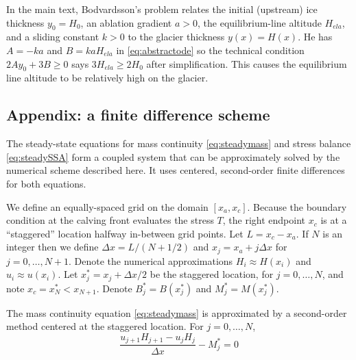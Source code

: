 \documentclass[twocolumn,letterpaper]{igs}
\begin{document}
In the main text, Bodvardsson's problem relates the initial (upstream) ice thickness $y_0=H_0$, an ablation gradient $a>0$, the equilibrium-line altitude $H_{ela}$, and a sliding constant $k>0$ to the glacier thickness $y(x) = H(x)$.  He has $A=-ka$ and $B=k a H_{ela}$ in \eqref{eq:abstractode} so the technical condition $2A y_0 + 3 B \ge 0$ says $3 H_{ela} \ge 2 H_0$ after simplification.  This causes the equilibrium line altitude to be relatively high on the glacier.


\subsection{Appendix: a finite difference scheme}  The steady-state equations for mass continuity \eqref{eq:steadymass} and stress balance \eqref{eq:steadySSA} form a coupled system that can be approximately solved by the numerical scheme described here.  It uses centered, second-order finite differences for both equations.

We define an equally-spaced grid on the domain $[x_a,x_c]$.  Because the boundary condition at the calving front evaluates the stress $T$, the right endpoint $x_c$ is at a ``staggered'' location halfway in-between grid points.  Let $L=x_c-x_a$.  If $N$ is an integer then we define $\Delta x = L / (N+1/2)$ and $x_j = x_a + j\Delta x$ for $j=0,\dots,N+1$.  Denote the numerical approximations $H_i\approx H(x_i)$ and $u_i \approx u(x_i)$.  Let $x_j^* = x_j + \Delta x/2$ be the staggered location, for $j=0,\dots,N$, and note $x_c = x_N^* < x_{N+1}$.  Denote $B_j^*=B(x_j^*)$ and $M_j^*=M(x_j^*)$.

The mass continuity equation \eqref{eq:steadymass} is approximated by a second-order method centered at the staggered location.  For $j=0,\dots,N$,
\begin{equation}
\frac{u_{j+1} H_{j+1} - u_j H_j}{\Delta x} - M_j^* = 0 \label{eq:steadymassFD}
\end{equation}
\end{document}
